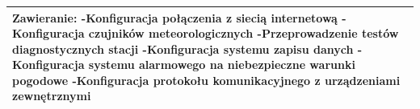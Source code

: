 \documentclass{article}
\begin{document}
\begin{center}
\begin{center}
\begin{tabular}{|l|l|l|}
        \hline
        \hline
        \multicolumn{3}{|p{\dimexpr\linewidth-2\tabcolsep-2\arrayrulewidth}|}{\textbf{Zawieranie:}
        \newline
        -Konfiguracja połączenia z siecią internetową
        \newline
        -Konfiguracja czujników meteorologicznych
        \newline
        -Przeprowadzenie testów diagnostycznych stacji
        \newline
        -Konfiguracja systemu zapisu danych
        \newline
        -Konfiguracja systemu alarmowego na niebezpieczne warunki pogodowe
        \newline
        -Konfiguracja protokołu komunikacyjnego z urządzeniami zewnętrznymi} \\
        \hline
        \end{tabular}
    \end{center}

    \newpage 


\end{center}
\end{document}
